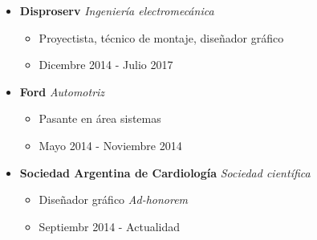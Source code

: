 \newcommand\job[4]{
    \item \textbf{#1} \textit{#2} 
        \begin{itemize}
            \item #3
            \item #4
        \end{itemize}
}
\begin{itemize}
    \job{Disproserv}{Ingeniería electromecánica}{Proyectista, técnico de montaje, diseñador gráfico}{Dicembre 2014 - Julio 2017}
    \job{Ford}{Automotriz}{Pasante en área sistemas}{Mayo 2014 - Noviembre 2014}
        \job{Sociedad Argentina de Cardiología}{Sociedad científica}{Diseñador gráfico
        \textit{Ad-honorem}}{Septiembr 2014 - Actualidad}
\end{itemize}
